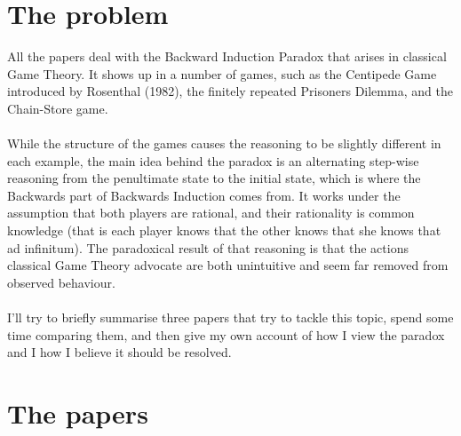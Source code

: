 \documentclass{article}
\begin{document}
\section{The problem}
All the papers deal with the Backward Induction Paradox that arises in classical Game Theory. It shows up in a number of games, such as the Centipede Game introduced by Rosenthal (1982), the finitely repeated Prisoners Dilemma, and the Chain-Store game.
\\
\\
While the structure of the games causes the reasoning to be slightly different in each example, the main idea behind the paradox is an alternating step-wise reasoning from the penultimate state to the initial state, which is where the Backwards part of Backwards Induction comes from. It works under the assumption that both players are rational, and their rationality is common knowledge %
(that is each player knows that the other knows that she knows that ad infinitum). The paradoxical result of that reasoning is that the actions classical Game Theory advocate are both unintuitive and seem far removed from observed behaviour.
\\
\\
I'll try to briefly summarise three papers that try to tackle this topic, spend some time comparing them, and then give my own account of how I view the paradox and I how I believe it should be resolved. 

\section{The papers}
\end{document}
